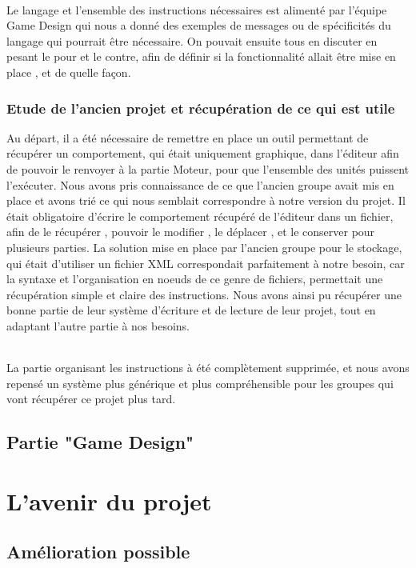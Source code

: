 \documentclass{report}
\begin{document}
\paragraph{}
Le langage et l'ensemble des instructions nécessaires est alimenté par l'équipe Game Design qui nous a donné des exemples de messages ou de spécificités du langage qui pourrait être nécessaire. On pouvait ensuite tous en discuter en pesant le pour et le contre, afin de définir si la fonctionnalité allait être mise en place , et de quelle façon.
\section{Etude de l'ancien projet et récupération de ce qui est utile}
Au départ, il a été nécessaire de remettre en place un outil permettant de récupérer un comportement, qui était uniquement graphique, dans l'éditeur afin de pouvoir le renvoyer à la partie Moteur, pour que l'ensemble des unités puissent l'exécuter.
Nous avons pris connaissance de ce que l'ancien groupe avait mis en place et avons trié ce qui nous semblait correspondre à notre version du projet.
Il était obligatoire d'écrire le comportement récupéré de l'éditeur dans un fichier, afin de le récupérer , pouvoir le modifier , le déplacer , et le conserver pour plusieurs parties.
La solution mise en place par l'ancien groupe pour le stockage, qui était d'utiliser un fichier XML correspondait parfaitement à notre besoin, car la syntaxe et l'organisation en noeuds de ce genre de fichiers, permettait une récupération simple et claire des instructions. Nous avons ainsi pu récupérer une bonne partie de leur système d'écriture et de lecture de leur projet, tout en adaptant l'autre partie à nos besoins.
\paragraph{}
La partie organisant les instructions à été complètement supprimée, et nous avons repensé un système plus générique et plus compréhensible pour les groupes qui vont récupérer ce projet plus tard.
\newpage
\chapter{Partie "Game Design"}

\newpage
\part{L'avenir du projet}
\chapter{Amélioration possible}

%
%
\end{document}
